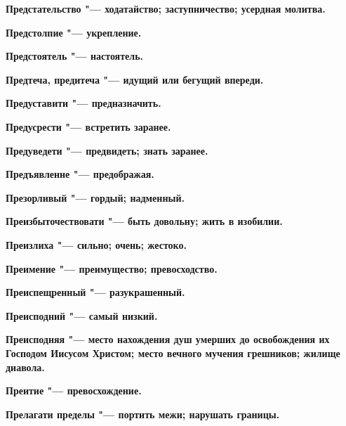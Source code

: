 \begin{mymulticols}{2}
\bfseries Предстательство\normalfont{} "--- ходатайство; заступничество; усердная молитва. 




\bfseries Предстолпие\normalfont{} "--- укрепление. 




\bfseries Предстоятель\normalfont{} "--- настоятель. 




\bfseries Предтеча, предитеча\normalfont{} "--- идущий или бегущий впереди. 




\bfseries Предуставити\normalfont{} "--- предназначить. 




\bfseries Предусрести\normalfont{} "--- встретить заранее. 




\bfseries Предуведети\normalfont{} "--- предвидеть; знать заранее. 




\bfseries Предъявленне\normalfont{} "--- предображая. 




\bfseries Презорливый\normalfont{} "--- гордый; надменный. 




\bfseries Преизбыточествовати\normalfont{} "--- быть довольну; жить в изобилии. 




\bfseries Преизлиха\normalfont{} "--- сильно; очень; жестоко. 




\bfseries Преимение\normalfont{} "--- преимущество; превосходство. 




\bfseries Преиспещренный\normalfont{} "--- разукрашенный. 




\bfseries Преисподний\normalfont{} "--- самый низкий. 




\bfseries Преисподняя\normalfont{} "--- место нахождения душ умерших до освобождения их Господом Иисусом Христом; место вечного мучения грешников; жилище диавола. 




\bfseries Преитие\normalfont{} "--- превосхождение. 




\bfseries Прелагати пределы\normalfont{} "--- портить межи; нарушать границы. 





\end{mymulticols}
